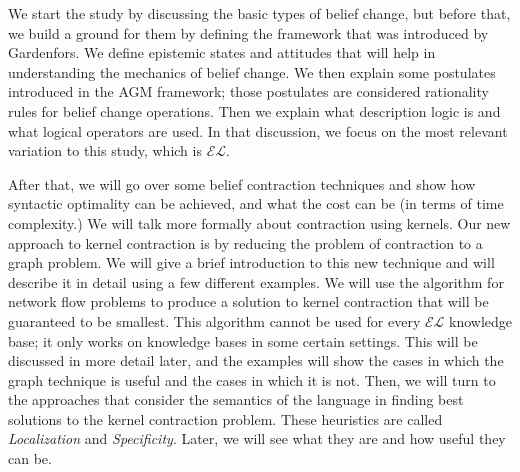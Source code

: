 We start the study by discussing the basic types of belief change, but before that, we build a ground for them by defining the framework that was introduced by Gardenfors. We define epistemic states and attitudes that will help in understanding the mechanics of belief change. We then explain some postulates introduced in the AGM framework; those postulates are considered rationality rules for belief change operations. Then we explain what description logic is and what logical operators are used. In that discussion, we focus on the most relevant variation to this study, which is $\mathcal{EL}$. 

After that, we will go over some belief contraction techniques and show how syntactic optimality can be achieved, and what the cost can be (in terms of time complexity.) We will talk more formally about contraction using kernels. Our new approach to kernel contraction is by reducing the problem of contraction to a graph problem. We will give a brief introduction to this new technique and will describe it in detail using a few different examples. We will use the algorithm for network flow problems to produce a solution to kernel contraction that will be guaranteed to be smallest. This algorithm cannot be used for every $\mathcal{EL}$ knowledge base; it only works on knowledge bases in some certain settings. This will be discussed in more detail later, and the examples will show the cases in which the graph technique is useful and the cases in which it is not. Then, we will turn to the approaches that consider the semantics of the language in finding best solutions to the kernel contraction problem. These heuristics are called \textit{Localization} and \textit{Specificity}. Later, we will see what they are and how useful they can be.
